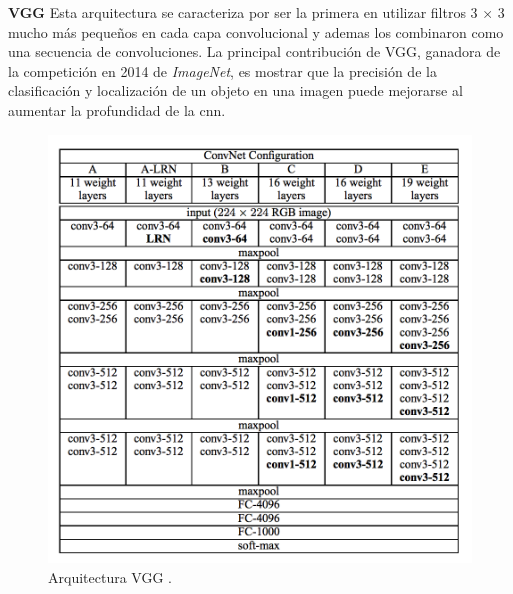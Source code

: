 \par \textbf{VGG} \citep{vgg} Esta arquitectura se caracteriza por ser la primera en utilizar filtros 3 × 3 mucho más pequeños en cada capa convolucional y ademas los combinaron como una secuencia de convoluciones. La principal contribución de VGG, ganadora de la competición en 2014 de \textit{ImageNet}, es mostrar que la precisión de la clasificación y localización de un objeto en una imagen puede mejorarse al aumentar la profundidad de la \ac{cnn}.

\begin{figure}[H]
 \centering
  \includegraphics[scale=0.6,keepaspectratio=true,clip=true]{imagenes/MarcoTeorico/vgg.png}
  \caption{Arquitectura VGG \citep{vgg}.}
	\label{Fig:vgg}
\end{figure}

